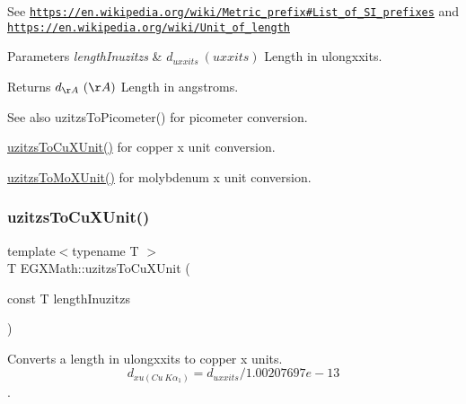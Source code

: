 See \href{https://en.wikipedia.org/wiki/Metric_prefix#List_of_SI_prefixes}{\tt https\+://en.\+wikipedia.\+org/wiki/\+Metric\+\_\+prefix\#\+List\+\_\+of\+\_\+\+S\+I\+\_\+prefixes} and \href{https://en.wikipedia.org/wiki/Unit_of_length}{\tt https\+://en.\+wikipedia.\+org/wiki/\+Unit\+\_\+of\+\_\+length} 
\begin{DoxyParams}{Parameters}
{\em length\+Inuzitzs} & $ d_{uxxits}\ (uxxits)$ Length in ulongxxits. \\
\hline
\end{DoxyParams}
\begin{DoxyReturn}{Returns}
$ d_{\AA}\ (\AA)$ Length in angstroms. 
\end{DoxyReturn}
\begin{DoxySeeAlso}{See also}
uzitzs\+To\+Picometer() for picometer conversion. 

\mbox{\hyperlink{group___e_g_x_math-_conversions-_length_conversions-uzitzs-_non-_s_i_gab25470e41b88c41d4bf32622baa6c472}{uzitzs\+To\+Cu\+X\+Unit()}} for copper x unit conversion. 

\mbox{\hyperlink{group___e_g_x_math-_conversions-_length_conversions-uzitzs-_non-_s_i_ga64b556911b0bb06cf315aa02f5e2d379}{uzitzs\+To\+Mo\+X\+Unit()}} for molybdenum x unit conversion. 
\end{DoxySeeAlso}
\mbox{\label{group___e_g_x_math-_conversions-_length_conversions-uzitzs-_non-_s_i_gab25470e41b88c41d4bf32622baa6c472}} 
\subsubsection{\texorpdfstring{uzitzs\+To\+Cu\+X\+Unit()}{uzitzsToCuXUnit()}}
{\footnotesize\ttfamily template$<$typename T $>$ \\
T E\+G\+X\+Math\+::uzitzs\+To\+Cu\+X\+Unit (\begin{DoxyParamCaption}\item[{const T}]{length\+Inuzitzs }\end{DoxyParamCaption})}



Converts a length in ulongxxits to copper x units. \[ d_{xu(Cu\ K\alpha_1)}=d_{uxxits} / 1.00207697e-13 \]. 


